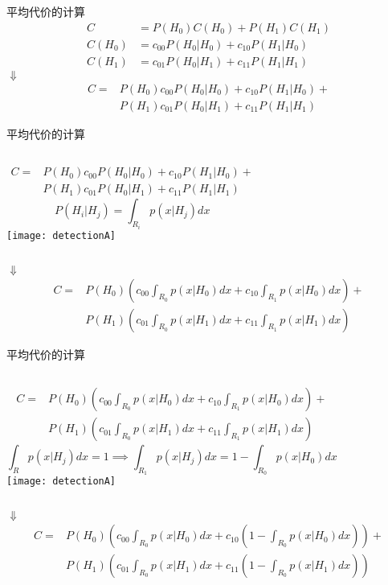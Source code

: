 \begin{frame}{平均代价的计算}
\begin{align*}
C&=P(H_0)C(H_0)+P(H_1)C(H_1)\\
C(H_0)&=c_{00}P(H_0|H_0)+c_{10}P(H_1|H_0)\\
C(H_1)&=c_{01}P(H_0|H_1)+c_{11}P(H_1|H_1)
\end{align*}
\centering $\Downarrow$
\begin{align*}
C=&P(H_0)c_{00}P(H_0|H_0)+c_{10}P(H_1|H_0)+\\
&P(H_1)c_{01}P(H_0|H_1)+c_{11}P(H_1|H_1)
\end{align*}
\end{frame}

\begin{frame}[shrink]{平均代价的计算}
\begin{columns}
	\begin{align*}
	C=&P(H_0)c_{00}P(H_0|H_0)+c_{10}P(H_1|H_0)+\\
	&P(H_1)c_{01}P(H_0|H_1)+c_{11}P(H_1|H_1)
	\end{align*}
	\[ P(H_i|H_j)=\int_{R_i}p(x|H_j)dx\]
	\texttt{[image: detectionA]}
\end{columns}

\medskip
\centering $\Downarrow$
\begin{align*}
C=&P(H_0)\left(c_{00}\int_{R_0}p(x|H_0)dx+c_{10}\int_{R_1}p(x|H_0)dx\right)+\\
&P(H_1)\left(c_{01}\int_{R_0}p(x|H_1)dx+c_{11}\int_{R_1}p(x|H_1)dx\right)
\end{align*}

\end{frame}

\begin{frame}[shrink]{平均代价的计算}
\begin{columns}
	\begin{align*}
	C=&P(H_0)\left(c_{00}\int_{R_0}p(x|H_0)dx+c_{10}\int_{R_1}p(x|H_0)dx\right)+\\
	&P(H_1)\left(c_{01}\int_{R_0}p(x|H_1)dx+c_{11}\int_{R_1}p(x|H_1)dx\right)
	\end{align*}
	\[\int_{R}p(x|H_j)dx=1 \implies \int_{R_1}p(x|H_j)dx=1-\int_{R_0}p(x|H_0)dx \]
	\texttt{[image: detectionA]}
\end{columns}

\medskip
\centering $\Downarrow$
\begin{align*}
C=&P(H_0)\left(c_{00}\int_{R_0}p(x|H_0)dx+c_{10}\left(1-\int_{R_0}p(x|H_0)dx\right)\right)+\\
&P(H_1)\left(c_{01}\int_{R_0}p(x|H_1)dx+c_{11}\left(1-\int_{R_0}p(x|H_1)dx\right)\right)
\end{align*}
\end{frame}

